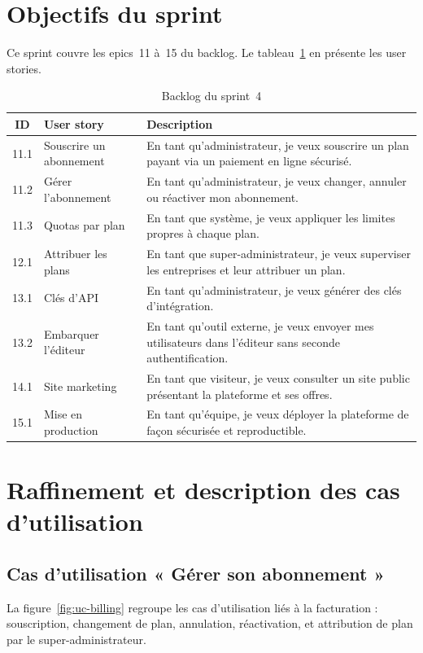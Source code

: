 \documentclass[12pt,a4paper,oneside]{report}
\begin{document}
\section{Objectifs du sprint}
Ce sprint couvre les epics~11 à~15 du backlog. Le
tableau~\ref{tab:backlog-s4} en présente les user stories.

\begin{table}[H]
\centering
\caption{Backlog du sprint~4}
\label{tab:backlog-s4}
\small
\begin{tabularx}{\linewidth}{clX}
\toprule
\textbf{ID} & \textbf{User story} & \textbf{Description} \\
\midrule
11.1 & Souscrire un abonnement & En tant qu'administrateur, je veux souscrire un plan payant via un paiement en ligne sécurisé. \\
11.2 & Gérer l'abonnement & En tant qu'administrateur, je veux changer, annuler ou réactiver mon abonnement. \\
11.3 & Quotas par plan & En tant que système, je veux appliquer les limites propres à chaque plan. \\
12.1 & Attribuer les plans & En tant que super-administrateur, je veux superviser les entreprises et leur attribuer un plan. \\
13.1 & Clés d'API & En tant qu'administrateur, je veux générer des clés d'intégration. \\
13.2 & Embarquer l'éditeur & En tant qu'outil externe, je veux envoyer mes utilisateurs dans l'éditeur sans seconde authentification. \\
14.1 & Site marketing & En tant que visiteur, je veux consulter un site public présentant la plateforme et ses offres. \\
15.1 & Mise en production & En tant qu'équipe, je veux déployer la plateforme de façon sécurisée et reproductible. \\
\bottomrule
\end{tabularx}
\end{table}

\section{Raffinement et description des cas d'utilisation}

\subsection{Cas d'utilisation « Gérer son abonnement »}
La figure~\ref{fig:uc-billing} regroupe les cas d'utilisation liés à la
facturation : souscription, changement de plan, annulation, réactivation, et
attribution de plan par le super-administrateur.
\end{document}
